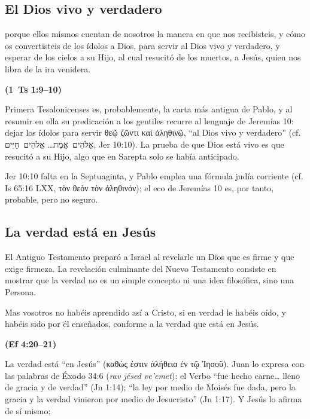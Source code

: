 \documentclass[11pt,letterpaper]{article}
\newcommand{\heb}[1]{\mbox{\foreignlanguage{hebrew}{#1}}}
\newcommand{\grc}[1]{\foreignlanguage{ancientgreek}{#1}}
\newcommand{\fuente}[1]{\par\hfill{\upshape\bfseries\small\textcolor{azul}{#1}}}
\begin{document}
\subsection{El Dios vivo y verdadero}
\begin{cita}porque ellos mismos cuentan de nosotros la manera en que nos recibisteis, y cómo os convertisteis de los ídolos a Dios, para servir al Dios vivo y verdadero, y esperar de los cielos a su Hijo, al cual resucitó de los muertos, a Jesús, quien nos libra de la ira venidera.\fuente{(1~Ts 1:9--10)}\end{cita}

Primera Tesalonicenses es, probablemente, la carta más antigua de Pablo, y al resumir en ella su predicación a los gentiles recurre al lenguaje de Jeremías 10: dejar los ídolos para servir \grc{θεῷ ζῶντι καὶ ἀληθινῷ}, ``al Dios vivo y verdadero'' (cf. \heb{אֱלֹהִים אֱמֶת}\ldots{} \heb{אֱלֹהִים חַיִּים}, Jer 10:10). La prueba de que Dios está vivo es que resucitó a su Hijo, algo que en Sarepta solo se había anticipado.

\begin{nota}[Precisión]
Jer 10:10 falta en la Septuaginta, y Pablo emplea una fórmula judía corriente (cf. Is 65:16 LXX, \grc{τὸν θεὸν τὸν ἀληθινόν}); el eco de Jeremías 10 es, por tanto, probable, pero no seguro.
\end{nota}

\subsection{La verdad está en Jesús}
El Antiguo Testamento preparó a Israel al revelarle un Dios que es firme y que exige firmeza. La revelación culminante del Nuevo Testamento consiste en mostrar que la verdad no es un simple concepto ni una idea filosófica, sino una Persona.

\begin{cita}Mas vosotros no habéis aprendido así a Cristo, si en verdad le habéis oído, y habéis sido por él enseñados, conforme a la verdad que está en Jesús.\fuente{(Ef 4:20--21)}\end{cita}

La verdad está ``en Jesús'' (\grc{καθώς ἐστιν ἀλήθεια ἐν τῷ Ἰησοῦ}). Juan lo expresa con las palabras de Éxodo 34:6 (\emph{rav jésed ve'emet}): el Verbo ``fue hecho carne\ldots{} lleno de gracia y de verdad'' (Jn 1:14); ``la ley por medio de Moisés fue dada, pero la gracia y la verdad vinieron por medio de Jesucristo'' (Jn 1:17). Y Jesús lo afirma de sí mismo:
\end{document}
